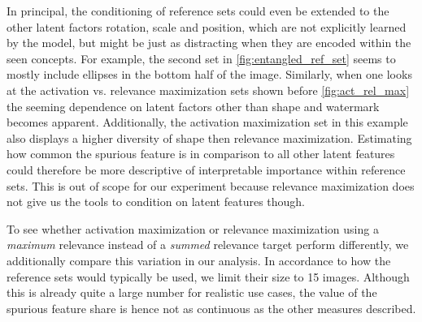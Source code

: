 In principal, the conditioning of reference sets could even be extended to the other latent factors rotation, scale and position, which are not explicitly learned by the model, but might be just as distracting when they are encoded within the seen concepts. For example, the second set in \cref{fig:entangled_ref_set} seems to mostly include ellipses in the bottom half of the image. 
Similarly, when one looks at the activation vs. relevance maximization sets shown before \cref{fig:act_rel_max} the seeming dependence on latent factors other than shape and watermark becomes apparent. Additionally, the activation maximization set in this example also displays a higher diversity of shape then relevance maximization. Estimating how common the spurious feature is in comparison to all other latent features could therefore be more descriptive of interpretable importance within reference sets. This is out of scope for our experiment because relevance maximization does not give us the tools to condition on latent features though. 

To see whether activation maximization or relevance maximization using a \textit{maximum} relevance instead of a \textit{summed} relevance target perform differently, we additionally compare this variation in our analysis. In accordance to how the reference sets would typically be used, we limit their size to 15 images. Although this is already quite a large number for realistic use cases, the value of the spurious feature share is hence not as continuous as the other measures described. 


